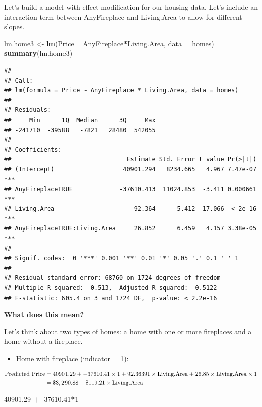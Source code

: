 \documentclass[]{book}
\newenvironment{Shaded}{\begin{snugshade}}{\end{snugshade}}
\newcommand{\DataTypeTok}[1]{\textcolor[rgb]{0.13,0.29,0.53}{#1}}
\newcommand{\DecValTok}[1]{\textcolor[rgb]{0.00,0.00,0.81}{#1}}
\newcommand{\FloatTok}[1]{\textcolor[rgb]{0.00,0.00,0.81}{#1}}
\newcommand{\KeywordTok}[1]{\textcolor[rgb]{0.13,0.29,0.53}{\textbf{#1}}}
\newcommand{\NormalTok}[1]{#1}
\newcommand{\OperatorTok}[1]{\textcolor[rgb]{0.81,0.36,0.00}{\textbf{#1}}}
\newcommand{\StringTok}[1]{\textcolor[rgb]{0.31,0.60,0.02}{#1}}
\providecommand{\tightlist}{%
  \setlength{\itemsep}{0pt}\setlength{\parskip}{0pt}}
\begin{document}
Let's build a model with effect modification for our housing data. Let's include an interaction term between AnyFireplace and Living.Area to allow for different slopes.

\begin{Shaded}
\begin{Highlighting}[]
\NormalTok{lm.home3 <-}\StringTok{ }\KeywordTok{lm}\NormalTok{(Price }\OperatorTok{~}\StringTok{ }\NormalTok{AnyFireplace}\OperatorTok{*}\NormalTok{Living.Area, }\DataTypeTok{data =}\NormalTok{ homes)}
\KeywordTok{summary}\NormalTok{(lm.home3)}
\end{Highlighting}
\end{Shaded}

\begin{verbatim}
## 
## Call:
## lm(formula = Price ~ AnyFireplace * Living.Area, data = homes)
## 
## Residuals:
##     Min      1Q  Median      3Q     Max 
## -241710  -39588   -7821   28480  542055 
## 
## Coefficients:
##                                Estimate Std. Error t value Pr(>|t|)    
## (Intercept)                   40901.294   8234.665   4.967 7.47e-07 ***
## AnyFireplaceTRUE             -37610.413  11024.853  -3.411 0.000661 ***
## Living.Area                      92.364      5.412  17.066  < 2e-16 ***
## AnyFireplaceTRUE:Living.Area     26.852      6.459   4.157 3.38e-05 ***
## ---
## Signif. codes:  0 '***' 0.001 '**' 0.01 '*' 0.05 '.' 0.1 ' ' 1
## 
## Residual standard error: 68760 on 1724 degrees of freedom
## Multiple R-squared:  0.513,  Adjusted R-squared:  0.5122 
## F-statistic: 605.4 on 3 and 1724 DF,  p-value: < 2.2e-16
\end{verbatim}

\textbf{What does this mean?}

Let's think about two types of homes: a home with one or more fireplaces and a home without a fireplace.

\begin{itemize}
\tightlist
\item
  Home with fireplace (indicator = 1):
\end{itemize}

\begin{align*}
\hbox{Predicted Price} &= 40901.29 + -37610.41 \times 1 + 92.36391 \times \hbox{Living.Area} + 26.85 \times \hbox{Living.Area} \times 1 \\
& = \$3,290.88 + \$119.21 \times \hbox{Living.Area}
\end{align*}

\begin{Shaded}
\begin{Highlighting}[]
\FloatTok{40901.29} \OperatorTok{+}\StringTok{ }\FloatTok{-37610.41}\OperatorTok{*}\DecValTok{1}
\end{Highlighting}
\end{Shaded}
\end{document}
